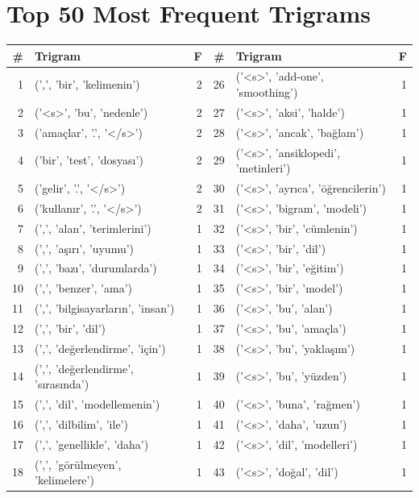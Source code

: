 \documentclass[a4paper,10pt]{article}
\begin{document}
\section{Top 50 Most Frequent Trigrams}
\vspace{-2pt}
\begin{center}
\scriptsize
\begin{tabular}{rlr|rlr}
\toprule
\# & Trigram & F & \# & Trigram & F \\
\midrule
1 & (',', 'bir', 'kelimenin') & 2 & 26 & ('<s>', 'add-one', 'smoothing') & 1 \\
2 & ('<s>', 'bu', 'nedenle') & 2 & 27 & ('<s>', 'aksi', 'halde') & 1 \\
3 & ('ama\c{c}lar', '.', '</s>') & 2 & 28 & ('<s>', 'ancak', 'ba\u{g}lam') & 1 \\
4 & ('bir', 'test', 'dosyas\i') & 2 & 29 & ('<s>', 'ansiklopedi', 'metinleri') & 1 \\
5 & ('gelir', '.', '</s>') & 2 & 30 & ('<s>', 'ayr\i ca', '\"o\u{g}rencilerin') & 1 \\
6 & ('kullan\i r', '.', '</s>') & 2 & 31 & ('<s>', 'bigram', 'modeli') & 1 \\
7 & (',', 'alan', 'terimlerini') & 1 & 32 & ('<s>', 'bir', 'c\"umlenin') & 1 \\
8 & (',', 'a\c{s}\i r\i', 'uyumu') & 1 & 33 & ('<s>', 'bir', 'dil') & 1 \\
9 & (',', 'baz\i', 'durumlarda') & 1 & 34 & ('<s>', 'bir', 'e\u{g}itim') & 1 \\
10 & (',', 'benzer', 'ama') & 1 & 35 & ('<s>', 'bir', 'model') & 1 \\
11 & (',', 'bilgisayarlar\i n', 'insan') & 1 & 36 & ('<s>', 'bu', 'alan') & 1 \\
12 & (',', 'bir', 'dil') & 1 & 37 & ('<s>', 'bu', 'ama\c{c}la') & 1 \\
13 & (',', 'de\u{g}erlendirme', 'i\c{c}in') & 1 & 38 & ('<s>', 'bu', 'yakla\c{s}\i m') & 1 \\
14 & (',', 'de\u{g}erlendirme', 's\i ras\i nda') & 1 & 39 & ('<s>', 'bu', 'y\"uzden') & 1 \\
15 & (',', 'dil', 'modellemenin') & 1 & 40 & ('<s>', 'buna', 'ra\u{g}men') & 1 \\
16 & (',', 'dilbilim', 'ile') & 1 & 41 & ('<s>', 'daha', 'uzun') & 1 \\
17 & (',', 'genellikle', 'daha') & 1 & 42 & ('<s>', 'dil', 'modelleri') & 1 \\
18 & (',', 'g\"or\"ulmeyen', 'kelimelere') & 1 & 43 & ('<s>', 'do\u{g}al', 'dil') & 1 \\

\end{tabular}
\end{center}
\end{document}
